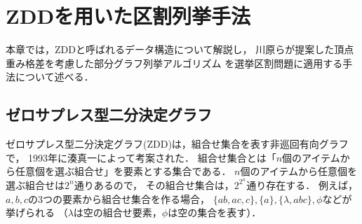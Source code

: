 \chapter{ZDDを用いた区割列挙手法} \label{chapter:3}

本章では，ZDDと呼ばれるデータ構造について解説し，
川原らが提案した頂点重み格差を考慮した部分グラフ列挙アルゴリズム\cite{kawahara}
を選挙区割問題に適用する手法について述べる．

\section{ゼロサプレス型二分決定グラフ}
ゼロサプレス型二分決定グラフ(ZDD)は，組合せ集合を表す非巡回有向グラフで，
1993年に湊真一によって考案された\cite{minato}．
組合せ集合とは「$n$個のアイテムから任意個を選ぶ組合せ」を要素とする集合である．
$n$個のアイテムから任意個を選ぶ組合せは$2^n$通りあるので，
その組合せ集合は，$2^{2^n}$通り存在する．
例えば，$a,b,c$の3つの要素から組合せ集合を作る場合，
$\{ab, ac, c\}, \{a\}, \{\lambda, abc\}, \phi$などが挙げられる
（$\lambda$は空の組合せ要素，$\phi$は空の集合を表す）．

